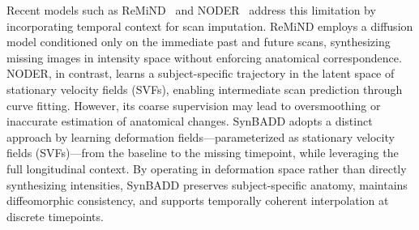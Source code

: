 Recent models such as ReMiND~\cite{yuan2024remind} and NODER~\cite{bai2024noder} address this limitation by incorporating temporal context for scan imputation. ReMiND employs a diffusion model conditioned only on the immediate past and future scans, synthesizing missing images in intensity space without enforcing anatomical correspondence. NODER, in contrast, learns a subject-specific trajectory in the latent space of stationary velocity fields (SVFs), enabling intermediate scan prediction through curve fitting. However, its coarse supervision may lead to oversmoothing or inaccurate estimation of anatomical changes. SynBADD adopts a distinct approach by learning deformation fields—parameterized as stationary velocity fields (SVFs)—from the baseline to the missing timepoint, while leveraging the full longitudinal context. By operating in deformation space rather than directly synthesizing intensities, SynBADD preserves subject-specific anatomy, maintains diffeomorphic consistency, and supports temporally coherent interpolation at discrete timepoints.









